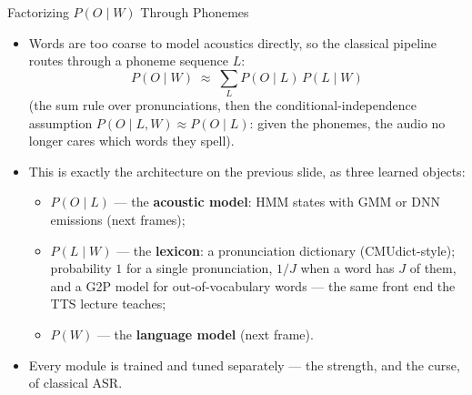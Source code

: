 \begin{frame}{Factorizing $P(O \mid W)$ Through Phonemes}
  \begin{itemize}
    \item Words are too coarse to model acoustics directly, so the classical pipeline routes through a
      phoneme sequence $L$:
      \[
        P(O \mid W) \;\approx\; \sum_{L} P(O \mid L)\, P(L \mid W)
      \]
      (the sum rule over pronunciations, then the conditional-independence assumption
      $P(O \mid L, W) \approx P(O \mid L)$: given the phonemes, the audio no longer cares which words they
      spell).
    \item This is exactly the architecture on the previous slide, as three learned objects:
      \begin{itemize}
        \item $P(O \mid L)$ --- the \textbf{acoustic model}: HMM states with GMM or DNN emissions (next frames);
        \item $P(L \mid W)$ --- the \textbf{lexicon}: a pronunciation dictionary (CMUdict-style); probability
          $1$ for a single pronunciation, $1/J$ when a word has $J$ of them, and a G2P model for
          out-of-vocabulary words --- the same front end the TTS lecture teaches;
        \item $P(W)$ --- the \textbf{language model} (next frame).
      \end{itemize}
    \item Every module is trained and tuned separately --- the strength, and the curse, of classical ASR.
  \end{itemize}
\end{frame}

